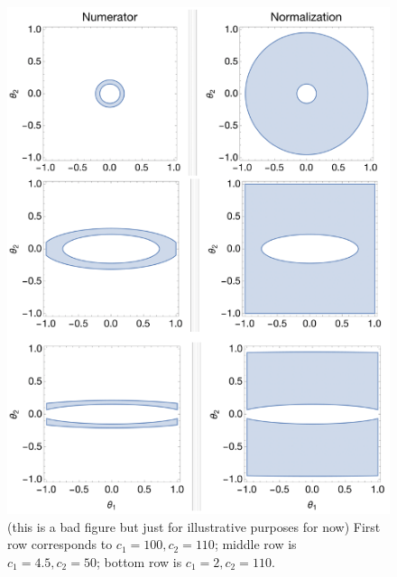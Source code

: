 \documentclass{article}
\begin{document}
\begin{figure}[h]
    \includegraphics[scale=0.5]{figs/ellipses.png}
    \centering
    \caption{(this is a bad figure but just for illustrative purposes for now) First row corresponds to $c_1 = 100, c_2=110$; middle row is $c_1 = 4.5, c_2=50$; bottom row is $c_1 = 2, c_2=110$.}
    \label{fig:2d-integration-area}
\end{figure}
\end{document}
